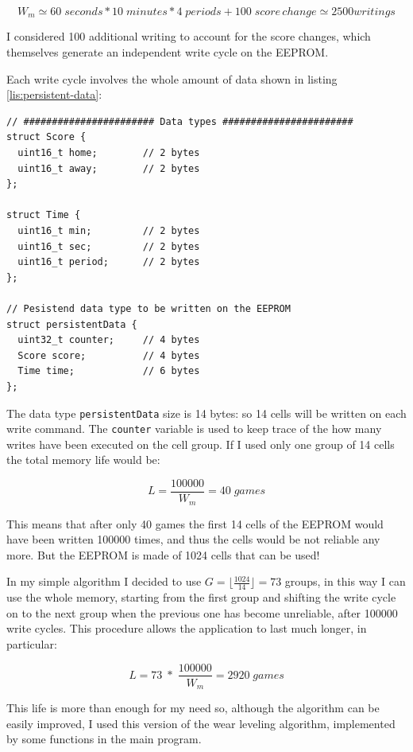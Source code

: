 \documentclass[11pt,english]{article}
\newcommand{\code}[1]{\texttt{#1}}
\begin{document}
\[
W_m \simeq 60 \; seconds * 10 \; minutes * 4 \; periods + 100 \; score \, change \simeq 2500 writings
\]

I considered 100 additional writing to account for the score changes, which themselves generate an independent 
write cycle on the EEPROM.  

Each write cycle involves the whole amount of data shown in listing \ref{lis:persistent-data}:

%
\begin{lstlisting}[label=lis:persistent-data,caption=Persistent data type]
// ####################### Data types #######################
struct Score {
  uint16_t home;        // 2 bytes
  uint16_t away;        // 2 bytes
};

struct Time {
  uint16_t min;         // 2 bytes
  uint16_t sec;         // 2 bytes
  uint16_t period;      // 2 bytes
};

// Pesistend data type to be written on the EEPROM
struct persistentData {
  uint32_t counter;     // 4 bytes
  Score score;          // 4 bytes
  Time time;            // 6 bytes
};
\end{lstlisting}

The data type \code{persistentData} size is 14 bytes: so 14 cells will be written on each write command. The 
\code{counter} variable is used to keep trace of the how many writes have been executed on the cell group. If 
I used only one group of 14 cells the total memory life would be:

\[
L = \frac{100000}{W_m} = 40 \; games
\] 

This means that after only 40 games the first 14 cells of the EEPROM would have been written 100000 times, and thus 
the cells would be not reliable any more. But the EEPROM is made of 1024 cells that can be used! 

In my simple algorithm I decided to use $G = \lfloor\tfrac{1024}{14}\rfloor = 73$ groups, in this way I can use 
the whole memory, starting from the first group and shifting the write cycle on to the next group when the previous 
one has become unreliable, after 100000 write cycles. 
This procedure allows the application to last much longer, in particular:

\[
L = 73 \; * \; \frac{100000}{W_m} = 2920 \; games
\]

This life is more than enough for my need so, although the algorithm can be easily improved, I used this version of 
the wear leveling algorithm, implemented by some functions in the main program.
\end{document}
